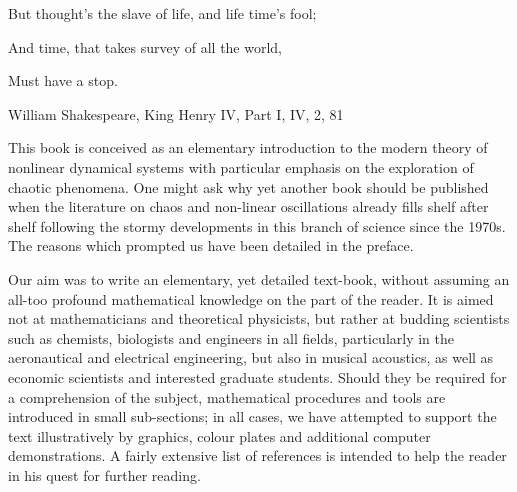 \documentclass[12pt]{article}
\begin{document}
But thought’s the slave of life, and life time’s fool;

And time, that takes survey of all the world,

Must have a stop.

William Shakespeare, King Henry IV, Part I, IV, 2, 81

\hfill

This book is conceived as an elementary introduction to the modern theory of nonlinear
dynamical systems with particular emphasis on the exploration of chaotic
phenomena. One might ask why yet another book should be published when the
literature on chaos and non-linear oscillations already fills shelf after shelf following
the stormy developments in this branch of science since the 1970s. The reasons
which prompted us have been detailed in the preface.

\hfill

Our aim was to write an elementary, yet detailed text-book, without assuming an
all-too profound mathematical knowledge on the part of the reader. It is aimed
not at mathematicians and theoretical physicists, but rather at budding scientists
such as chemists, biologists and engineers in all fields, particularly in the aeronautical
and electrical engineering, but also in musical acoustics, as well as economic
scientists and interested graduate students. Should they be required for a comprehension
of the subject, mathematical procedures and tools are introduced in small
sub-sections; in all cases, we have attempted to support the text illustratively by
graphics, colour plates and additional computer demonstrations. A fairly extensive
list of references is intended to help the reader in his quest for further reading.

\hfill
\end{document}
